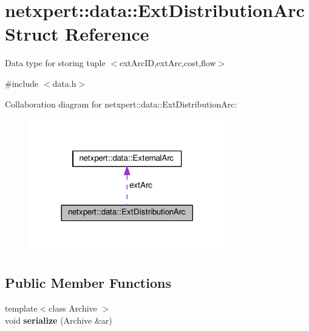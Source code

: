 \hypertarget{structnetxpert_1_1data_1_1ExtDistributionArc}{}\section{netxpert\+:\+:data\+:\+:Ext\+Distribution\+Arc Struct Reference}
\label{structnetxpert_1_1data_1_1ExtDistributionArc}


Data type for storing tuple $<$ext\+Arc\+ID,ext\+Arc,cost,flow$>$  




{\ttfamily \#include $<$data.\+h$>$}



Collaboration diagram for netxpert\+:\+:data\+:\+:Ext\+Distribution\+Arc\+:\nopagebreak
\begin{figure}[H]
\begin{center}
\leavevmode
\includegraphics[width=242pt]{structnetxpert_1_1data_1_1ExtDistributionArc__coll__graph}
\end{center}
\end{figure}
\subsection*{Public Member Functions}
\begin{DoxyCompactItemize}
\item 
{\footnotesize template$<$class Archive $>$ }\\void {\bfseries serialize} (Archive \&ar)\hypertarget{structnetxpert_1_1data_1_1ExtDistributionArc_af3bf2382bfa90bafc9c80baa6e9e160b}{}\label{structnetxpert_1_1data_1_1ExtDistributionArc_af3bf2382bfa90bafc9c80baa6e9e160b}

\end{DoxyCompactItemize}
